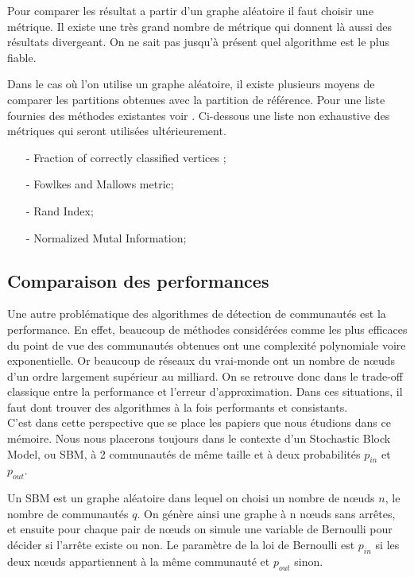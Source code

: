 Pour comparer les résultat a partir d'un graphe aléatoire il faut choisir une métrique.
Il existe une très grand nombre de métrique qui donnent là aussi des résultats divergeant.
On ne sait pas jusqu'à présent quel algorithme est le plus fiable.

Dans le cas où l'on utilise un graphe aléatoire, il existe plusieurs moyens de comparer les partitions obtenues avec la partition de référence.  
Pour une liste fournies des méthodes existantes voir \cite[p.77-79]{Community_detection_in_graphs}.
Ci-dessous une liste non exhaustive des métriques qui seront utilisées ultérieurement.
\begin{itemize}
	\item[-] Fraction of correctly classified vertices ; 
	\item[-] Fowlkes and Mallows metric; 
	\item[-] Rand Index; 
	\item[-] Normalized Mutal Information; 
\end{itemize}

\subsection{Comparaison des performances}
Une autre problématique des algorithmes de détection de communautés est la performance.
En effet, beaucoup de méthodes considérées comme les plus efficaces du point de vue des communautés obtenues ont une complexité polynomiale voire exponentielle.
Or beaucoup de réseaux du vrai-monde ont un nombre de nœuds d'un ordre largement supérieur au milliard. 
On se retrouve donc dans le trade-off classique entre la performance et l'erreur d'approximation. 
Dans ces situations, il faut dont trouver des algorithmes à la fois performants et consistants.\\

C'est dans cette perspective que se place les papiers que nous étudions dans ce mémoire.
Nous nous placerons toujours dans le contexte d'un Stochastic Block Model, ou SBM, à 2 communautés de même taille et à deux probabilités $p_{in}$ et $p_{out}$.

Un SBM est un graphe aléatoire dans lequel on choisi un nombre de nœuds $n$, le nombre de communautés $q$. 
On génère ainsi une graphe à n nœuds sans arrêtes, et ensuite pour chaque pair de nœuds on simule une variable de Bernoulli pour décider si l’arrête existe ou non.
Le paramètre de la loi de Bernoulli est $p_{in}$ si les deux nœuds appartiennent à la même communauté et $p_{out}$ sinon.

